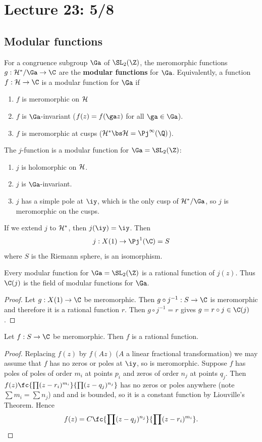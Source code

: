 \section{Lecture 23: 5/8}
\subsection{Modular functions}
For a congruence subgroup $\Ga$ of $\SL_2(\Z)$, the meromorphic functions $g:\cal H^*/\Ga\to \C$ are the \textbf{modular functions} for $\Ga$. Equivalently, a function $f:\cal H\to \C$ is a modular function for $\Ga$ if
\begin{enumerate}
\item
$f$ is meromorphic on $\cal H$
\item
$f$ is $\Ga$-invariant ($f(z)=f(\ga z)$ for all $\ga\in \Ga$).
\item
$f$ is meromorphic at cusps ($\cal H^*\bs \cal H=\Pj^1(\Q)$).
\end{enumerate}
\begin{ex}
The $j$-function is a modular function for $\Ga=\SL_2(\Z)$:
\begin{enumerate}
\item
$j$ is holomorphic on $\cal H$.
\item
$j$ is $\Ga$-invariant. 
\item
$j$ has a simple pole at $\iy$, which is the only cusp of $\cal H^*/\Ga$, so $j$ is meromorphic on the cusps.
\end{enumerate}
If we extend $j$ to $\cal H^*$, then $j(\iy)=\iy$. Then
\[
j:X(1)\to \Pj^1(\C)=S
\]
where $S$ is the Riemann sphere, is an isomorphism.
\end{ex}
\begin{thm}
Every modular function for $\Ga=\SL_2(\Z)$ is a rational function of $j(z)$. Thus $\C(j)$ is the field of modular functions for $\Ga$.
\end{thm}
\begin{proof}
Let $g:X(1)\to \C$ be meromorphic. Then $g\circ j^{-1}:S\to \C$ is meromorphic and therefore it is a rational function $r$. Then $g\circ j^{-1}=r$ gives $g=r\circ j\in \C(j)$.
\end{proof}
\begin{lem}
Let $f:S\to \C$ be meromorphic. Then $f$ is a rational function.
\end{lem}
\begin{proof}
Replacing $f(z)$ by $f(Az)$ ($A$ a linear fractional transformation) we may assume that $f$ has no zeros or poles at $\iy$, so is meromorphic. Suppose $f$ has poles of poles of order $m_i$ at points $p_i$ and zeros of order $n_j$ at points $q_j$. Then $f(z)\fc{\prod (z-r_i)^{m_i}}{\prod (z-q_j)^{n_j}}$ has no zeros or poles anywhere (note $\sum m_i=\sum n_j$) and and is bounded, so it is a constant function by Liouville's Theorem. Hence
\[
f(z)=C\fc{\prod (z-q_j)^{n_j}}{\prod (z-r_i)^{m_i}}.
\]
\end{proof}
